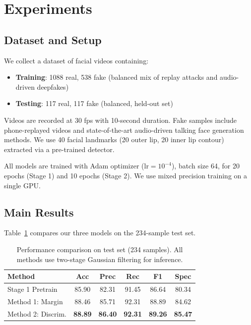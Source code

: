 \documentclass[11pt,twocolumn]{article}
\begin{document}
\section{Experiments}
\label{sec:experiments}

\subsection{Dataset and Setup}

We collect a dataset of facial videos containing:
\begin{itemize}
    \item \textbf{Training}: 1088 real, 538 fake (balanced mix of replay attacks and audio-driven deepfakes)
    \item \textbf{Testing}: 117 real, 117 fake (balanced, held-out set)
\end{itemize}

Videos are recorded at 30 fps with 10-second duration. Fake samples include phone-replayed videos and state-of-the-art audio-driven talking face generation methods. We use 40 facial landmarks (20 outer lip, 20 inner lip contour) extracted via a pre-trained detector.

All models are trained with Adam optimizer ($\text{lr}=10^{-4}$), batch size 64, for 20 epochs (Stage 1) and 10 epochs (Stage 2). We use mixed precision training on a single GPU.

\subsection{Main Results}

Table~\ref{tab:main_results} compares our three models on the 234-sample test set.

\begin{table}[t]
\caption{Performance comparison on test set (234 samples). All methods use two-stage Gaussian filtering for inference.}
\label{tab:main_results}
\centering
\small
\begin{tabular}{lccccc}
\toprule
Method & Acc & Prec & Rec & F1 & Spec \\
\midrule
Stage 1 Pretrain & 85.90 & 82.31 & 91.45 & 86.64 & 80.34 \\
\midrule
Method 1: Margin & 88.46 & 85.71 & 92.31 & 88.89 & 84.62 \\
Method 2: Discrim. & \textbf{88.89} & \textbf{86.40} & \textbf{92.31} & \textbf{89.26} & \textbf{85.47} \\
\bottomrule
\end{tabular}
\end{table}
\end{document}
